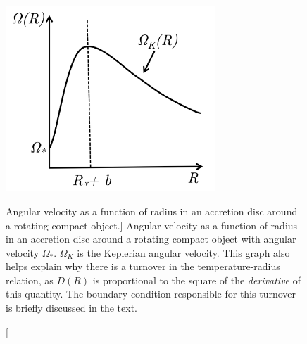 \begin{figure}
\centering
\includegraphics[width=0.7\textwidth]{figures/01-intro/omega_r.png}
\caption
[Angular velocity as a function of radius in an accretion disc around a rotating
compact object.]
{
Angular velocity as a function of radius in an accretion disc around a rotating
compact object with angular velocity $\Omega_*$. $\Omega_K$ is the Keplerian 
angular velocity. This graph
also helps explain why there is a turnover in the temperature-radius relation,
as $D(R)$ is proportional to the square of the {\em derivative} of this quantity.
The boundary condition responsible for this turnover is briefly 
discussed in the text.
} 
\label{fig:omega}
\end{figure}

